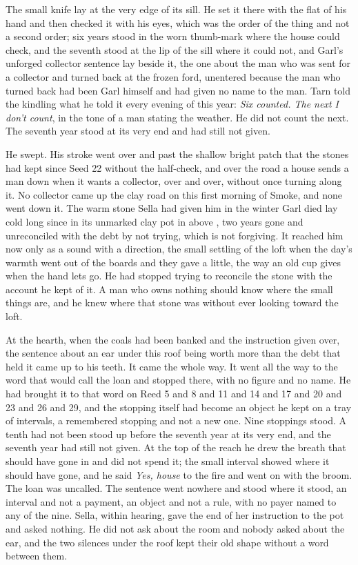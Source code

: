 The small knife lay at the very edge of its sill. He set it there with the flat of his hand and then checked it with his eyes, which was the order of the thing and not a second order; six years stood in the worn thumb-mark where the house could check, and the seventh stood at the lip of the sill where it could not, and Garl's unforged collector sentence lay beside it, the one about the man who was sent for a collector and turned back at the frozen ford, unentered because the man who turned back had been Garl himself and had given no name to the man. Tarn told the kindling what he told it every evening of this year: \emph{Six counted. The next I don't count}, in the tone of a man stating the weather. He did not count the next. The seventh year stood at its very end and had still not given.

He swept. His stroke went over  and past the shallow bright patch that the stones had kept since Seed 22 without the half-check, and over the road a house sends a man down when it wants a collector, over and over, without once turning along it. No collector came up the clay road on this first morning of Smoke, and none went down it. The warm stone Sella had given him in the winter Garl died lay cold long since in its unmarked clay pot in  above , two years gone and unreconciled with the debt by not trying, which is not forgiving. It reached him now only as a sound with a direction, the small settling of the loft when the day's warmth went out of the boards and they gave a little, the way an old cup gives when the hand lets go. He had stopped trying to reconcile the stone with the account he kept of it. A man who owns nothing should know where the small things are, and he knew where that stone was without ever looking toward the loft.

At the hearth, when the coals had been banked and the instruction given over, the sentence about an ear under this roof being worth more than the debt that held it came up to his teeth. It came the whole way. It went all the way to the word that would call the loan and stopped there, with no figure and no name. He had brought it to that word on Reed 5 and 8 and 11 and 14 and 17 and 20 and 23 and 26 and 29, and the stopping itself had become an object he kept on a tray of intervals, a remembered stopping and not a new one. Nine stoppings stood. A tenth had not been stood up before the seventh year at its very end, and the seventh year had still not given. At the top of the reach he drew the breath that should have gone in and did not spend it; the small interval showed where it should have gone, and he said \emph{Yes, house} to the fire and went on with the broom. The loan was uncalled. The sentence went nowhere and stood where it stood, an interval and not a payment, an object and not a rule, with no payer named to any of the nine. Sella, within hearing, gave the end of her instruction to the pot and asked nothing. He did not ask about the room and nobody asked about the ear, and the two silences under the roof kept their old shape without a word between them.

